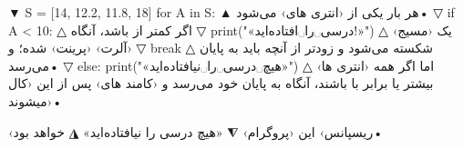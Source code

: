 \documentclass[openany, twocolumn]{book}
\begin{document}
\begin{InlinePrograms}
\begin{Program}
▼
S = [14, 12.2, 11.8, 18]
for A in S:
▲
  هر بار یکی از ‹انتری های›  می‌شود• 
▽
	if A < 10:
△
 اگر  کمتر از  باشد، آنگاه 
▽
		print("«درسی␣را␣افتاده‌اید!»")
△
 یک ‹مسیج› ‹آلرت› ‹پرینت› شده؛ و 
▽
		break
△
  شکسته می‌شود و زود‌تر از آنچه باید به پایان می‌رسد• 
▽
else:
	print("«هیچ␣درسی␣را␣نیافتاده‌اید»")
△
 اما اگر همه ‹انتری ها› بیشتر یا برابر با  باشند، آنگاه  به پایان خود می‌رسد و ‹کامند های› پس از این  ‹کال میشوند›•

‹ریسپانس› این ‹پروگرام› 
⧩
«هیچ درسی را نیافتاده‌اید»
◮
 خواهد بود•
\end{Program}
\end{InlinePrograms}
\backmatter
\printbibliography
\end{document}
